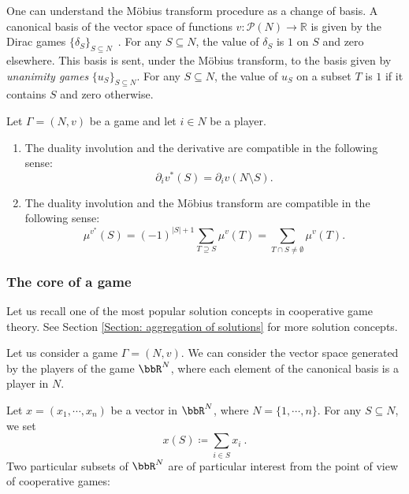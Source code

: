 \documentclass[a4paper,12pt]{amsart}
\begin{document}
\medskip 

One can understand the Möbius transform procedure as a change of basis. A canonical basis of the vector space of functions $v: \mathcal{P}(N) \longrightarrow \mathbb{R}$ is given by the Dirac games $\{\delta_S\}_{S \subseteq N}$~\cite{Shapley1953}. For any $S \subseteq N$, the value of $\delta_S$ is $1$ on $S$ and zero elsewhere. This basis is sent, under the Möbius transform, to the basis given by \textit{unanimity games} $\{u_S\}_{S \subseteq N}$. For any $S \subseteq N$, the value of $u_S$ on a subset $T$ is $1$ if it contains $S$ and zero otherwise.

\begin{lemma}\label{lemma: duality and derivatives}
Let \(\Gamma = (N, v)\) be a game and let $i \in N$ be a player.
\begin{enumerate}
    \item The duality involution and the derivative are compatible in the following sense:
    \[
    \partial_i v^*(S) = \partial_i v(N \setminus S). 
    \]
    \item The duality involution and the M{\"o}bius transform are compatible in the following sense: 
\[
\mu^{v^*}(S) = (-1)^{\lvert S \rvert + 1} \sum_{T \supseteq S} \mu^v(T) = \sum_{T \cap S \neq \emptyset} \mu^v(T). 
\]
\end{enumerate}
\end{lemma}

\subsubsection{The core of a game}\label{subsubsection: the core of a game} Let us recall one of the most popular solution concepts in cooperative game theory. See Section \ref{Section: aggregation of solutions} for more solution concepts. 

\medskip

Let us consider a game \(\Gamma = (N, v)\). We can consider the vector space generated by the players of the game $\bbR^N$, where each element of the canonical basis is a player in $N$. 

\medskip

Let $x = (x_1, \cdots, x_n)$ be a vector in $\bbR^N$, where $N = \{1,\cdots,n\}$. For any $S \subseteq N$, we set
    \[
    x(S) \coloneqq \sum_{i \in S} x_i~. 
    \]
Two particular subsets of $\bbR^N$ are of particular interest from the point of view of cooperative games:
\end{document}
